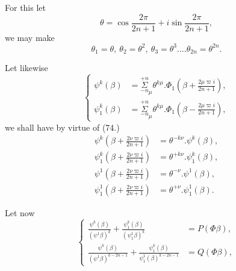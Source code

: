 \documentclass{article}
\begin{document}
For this let
\[ \theta=\cos\frac{2\pi}{2n+1}+i\sin\frac{2\pi}{2n+1}, \]
we may make
\[ \theta_{1}=\theta,\ \theta_{2}=\theta^{2},\ \theta_{3}=\theta^{3}....\theta_{2n}=\theta^{2n}. \]

Let likewise
\[ \left\{\begin{aligned}
\psi^{k}(\beta)&=\overset{+n}{\underset{-n}{\Sigma}}_{\mu}\theta^{k\mu}.\Phi_{1}\left(\beta+\frac{2\mu\varpi i}{2n+1}\right),\\
\psi_{1}^{k}(\beta)&=\overset{+n}{\underset{-n}{\Sigma}}_{\mu}\theta^{k\mu}.\Phi_{1}\left(\beta-\frac{2\mu\varpi i}{2n+1}\right),
\end{aligned}\right. \tag{85.} \]
we shall have by virtue of (74.)
\[ \begin{aligned}
\psi^{k}\left(\beta+\frac{2\nu\varpi i}{2n+1}\right)&=\theta^{-k\nu}.\psi^{k}(\beta),\\
\psi_{1}^{k}\left(\beta+\frac{2\nu\varpi i}{2n+1}\right)&=\theta^{+k\nu}.\psi_{1}^{k}(\beta),\\
\psi^{1}\left(\beta+\frac{2\nu\varpi i}{2n+1}\right)&=\theta^{-\nu}.\psi^{1}(\beta),\\
\psi_{1}^{1}\left(\beta+\frac{2\nu\varpi i}{2n+1}\right)&=\theta^{+\nu}.\psi_{1}^{1}(\beta).
\end{aligned} \]

Let now
\[ \left\{\begin{aligned}
\frac{\psi^{k}(\beta)}{(\psi^{1}\beta)^{k}}+\frac{\psi_{1}^{k}(\beta)}{(\psi_{1}^{1}\beta)^{k}}&=P(\Phi\beta),\\
\frac{\psi^{k}(\beta)}{(\psi^{1}\beta)^{k-2n-1}}+\frac{\psi_{1}^{k}(\beta)}{\psi_{1}^{1}(\beta)^{k-2n-1}}&=Q(\Phi\beta),
\end{aligned}\right. \tag{86.} \]
\end{document}
